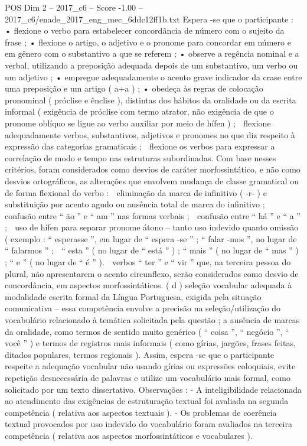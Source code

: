 \begin{textsample}{POS Dim 2 – 2017\_c6 – Score -1.00 – 2017\_c6/enade\_2017\_eng\_mec\_6ddc12ff1b.txt}
Espera -se que o participante : • flexione o verbo para estabelecer concordância de número com o sujeito da frase ; • flexione o artigo, o adjetivo e o pronome para concordar em número e em gênero com o substantivo a que se referem ; • observe a regência nominal e a verbal, utilizando a preposição adequada depois de um substantivo, um verbo ou um adjetivo ; • empregue adequadamente o acento grave indicador da crase entre uma preposição e um artigo ( a+a ) ; • obedeça às regras de colocação pronominal ( próclise e ênclise ), distintas dos hábitos da oralidade ou da escrita informal ( exigência de próclise com termo atrator, não exigência de que o pronome oblíquo se ligue ao verbo auxiliar por meio de hífen ) ;  flexione adequadamente verbos, substantivos, adjetivos e pronomes no que diz respeito à expressão das categorias gramaticais ;  flexione os verbos para expressar a correlação de modo e tempo nas estruturas subordinadas.
Com base nesses critérios, foram considerados como desvios de caráter morfossintático, e não como desvios ortográficos, as alterações que envolvem mudança de classe gramatical ou de forma flexional do verbo :  eliminação da marca de infinitivo ( -r- ) e substituição por acento agudo ou ausência total de marca do infinitivo ;  confusão entre “ ão ” e “ am ” nas formas verbais ;  confusão entre “ há ” e “ a ” ;  uso de hífen para separar pronome átono – tanto uso indevido quanto omissão ( exemplo : “ esperasse ”, em lugar de “ espera -se ” ; “ falar -mos ”, no lugar de “ falarmos ” ;  “ esta ” ( no lugar de “ está ” ) ; “ mais ” ( no lugar de “ mas ” ) ; “ e ” ( no lugar de “ é ” ).  verbos “ ter ” e “ vir ” que, na terceira pessoa do plural, não apresentarem o acento circunflexo, serão considerados como desvio de concordância, em aspectos morfossintáticos. ( d ) seleção vocabular adequada à modalidade escrita formal da Língua Portuguesa, exigida pela situação comunicativa – essa competência envolve a precisão na seleção/utilização do vocabulário relacionado à temática solicitada pela questão ; a ausência de marcas da oralidade, como termos de sentido muito genérico ( “ coisa ”, “ negócio ”, “ você ” ) e termos de registros mais informais ( como gírias, jargões, frases feitas, ditados populares, termos regionais ).
Assim, espera -se que o participante respeite a adequação vocabular não usando gírias ou expressões coloquiais, evite repetição desnecessária de palavras e utilize um vocabulário mais formal, como solicitado por um texto dissertativo.
Observações : - A inteligibilidade relacionada ao atendimento das exigências de estruturação textual foi avaliada na segunda competência ( relativa aos aspectos textuais ). - Os problemas de coerência textual provocados por uso indevido do vocabulário foram avaliados na terceira competência ( relativa aos aspectos morfossintáticos e vocabulares ).

\end{textsample}

